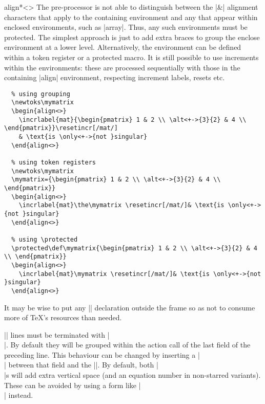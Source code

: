 \documentclass[a4paper]{ltxdoc}
\begin{document}
\begin{environment}{{align*<>}}
    The pre-processor is not able to distinguish between the |&| alignment
    characters that apply to the containing environment and any that appear
    within enclosed environments, such as |array|.  Thus, any such environments
    must be protected.  The simplest approach is just to add extra braces to
    group the enclose environment at a lower level.  Alternatively, the
    environment can be defined within a token register or a protected macro.  It
    is still possible to use increments within the environments: these are
    processed sequentially with those in the containing |align| environment,
    respecting increment labels, resets etc.

    \example
\begin{verbatim}
  % using grouping
  \newtoks\mymatrix
  \begin{align<>}
    \incrlabel{mat}{\begin{pmatrix} 1 & 2 \\ \alt<+->{3}{2} & 4 \\ \end{pmatrix}}\resetincr[/mat/]
    & \text{is \only<+->{not }singular}
  \end{align<>}

  % using token registers
  \newtoks\mymatrix
  \mymatrix={\begin{pmatrix} 1 & 2 \\ \alt<+->{3}{2} & 4 \\ \end{pmatrix}}
  \begin{align<>}
    \incrlabel{mat}\the\mymatrix \resetincr[/mat/]& \text{is \only<+->{not }singular}
  \end{align<>}

  % using \protected
  \protected\def\mymatrix{\begin{pmatrix} 1 & 2 \\ \alt<+->{3}{2} & 4 \\ \end{pmatrix}}
  \begin{align<>}
    \incrlabel{mat}\mymatrix \resetincr[/mat/]& \text{is \only<+->{not }singular}
  \end{align<>}

\end{verbatim}
    It may be wise to put any |\newtoks| declaration outside the frame so as not
    to consume more of \TeX's resources than needed.  

    |\intertext| lines must be terminated with |\\|.  By default they will be
    grouped within the action call of the last field of the preceding line.
    This behaviour can be changed by inserting a |\\| between that field and the
    |\intertext|.  By default, both |\\|s will add extra vertical space (and an
    equation number in non-starred variants).  These can be avoided by using
    a form like |\nonumber\\[-3ex]| instead.


\end{environment}
\end{document}
